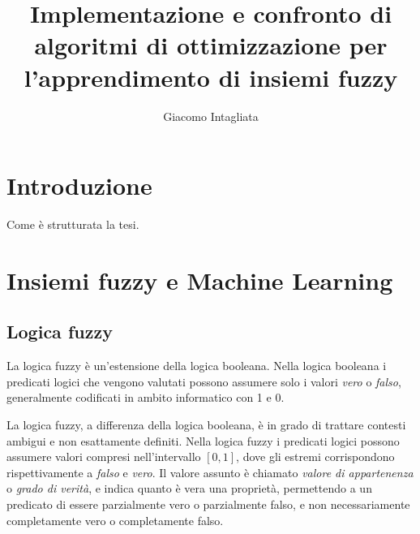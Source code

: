 \documentclass[a4paper,12pt]{report}
\begin{document}
\title{Implementazione e confronto di algoritmi di ottimizzazione per l'apprendimento di insiemi fuzzy}
\author{Giacomo Intagliata}
%
% 
%
\beforepreface

%
%
\afterpreface

%
\chapter*{Introduzione}
\label{Introduzione}
%
Come è strutturata la tesi.
% 


\chapter{Insiemi fuzzy e Machine Learning}
\label{Capitolo 1}
\section{Logica fuzzy}
La logica fuzzy \cite{logica_fuzzy} è un'estensione della logica booleana.
Nella logica booleana i predicati logici che vengono valutati possono assumere solo i valori \textit{vero} o \textit{falso}, generalmente codificati in ambito informatico con 1 e 0.


La logica fuzzy, a differenza della logica booleana, è in grado di trattare contesti ambigui e non esattamente definiti.
Nella logica fuzzy i predicati logici possono assumere valori compresi nell'intervallo $[0,1]$, dove gli estremi corrispondono rispettivamente a \textit{falso} e \textit{vero}.
Il valore assunto è chiamato \textit{valore di appartenenza} o \textit{grado di verità}, e indica quanto è vera una proprietà, permettendo a un predicato di essere parzialmente vero o parzialmente falso, e non necessariamente completamente vero o completamente falso.
\end{document}

